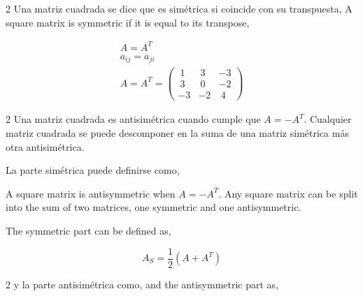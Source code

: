 \begin{paracol}{2}
Una matriz cuadrada se dice que es simétrica si coincide con su transpuesta,
\switchcolumn
A square matrix is symmetric if it is equal to its transpose,
\end{paracol}

\begin{gather*}
A=A^T\\
a_{ij}=a_{ji}\\
A=A^T=
\begin{pmatrix}
\ 1&\ 3&-3\\
\ 3&\ 0&-2\\
-3&-2&\ 4
\end{pmatrix}
\end{gather*}

\begin{paracol}{2}
Una matriz cuadrada es antisimétrica cuando cumple que $A=-A^T$. Cualquier matriz cuadrada se puede descomponer en la suma de una matriz simétrica más otra antisimétrica.

La parte simétrica puede definirse como,

\switchcolumn
A square matrix is antisymmetric when $A=-A^T$. Any square matrix can be split into the sum of two matrices, one symmetric and one antisymmetric.

The symmetric part can be defined as,
    
\end{paracol}
\begin{equation*}
A_S=\frac{1}{2} \left( A+A^T \right)
\end{equation*}

\begin{paracol}{2}
y la parte antisimétrica como,
\switchcolumn
and the antisymmetric part as,   
\end{paracol}

